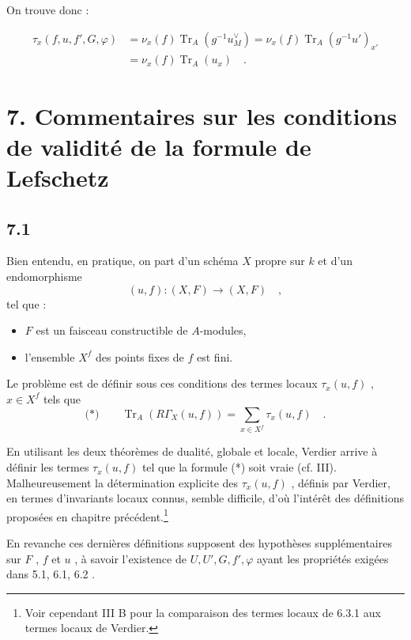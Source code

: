 \documentclass[11pt]{article}
\providecommand{\Tr}{\operatorname{Tr}}
\providecommand{\Tr}{\operatorname{Tr}}
\providecommand{\Tr}{\operatorname{Tr}}
\providecommand{\Tr}{\operatorname{Tr}}
\providecommand{\Tr}{\operatorname{Tr}}
\begin{document}
On trouve donc :

\begin{equation}\tag{6.4.9}
\begin{aligned}
\tau_x(f,u, f', G, \varphi) &= \nu_x(f) \Tr_A(g^{-1}u_M^\vee) = \nu_x(f) \Tr_A(g^{-1}u')_{x'} \\
&= \nu_x(f) \Tr_A(u_x) \quad .
\end{aligned}
\end{equation}

\section*{7. Commentaires sur les conditions de validité de la formule de Lefschetz}

\subsection*{7.1}
Bien entendu, en pratique, on part d'un schéma $X$ propre sur $k$ et d'un endomorphisme
\[
(u, f) : (X, F) \longrightarrow (X, F) \quad ,
\]
tel que :
\begin{itemize}
\item $F$ est un faisceau constructible de $A$-modules,
\item l'ensemble $X^f$ des points fixes de $f$ est fini.
\end{itemize}

Le problème est de définir sous ces conditions des termes locaux $\tau_x(u, f)$ , $x \in X^f$ tels que
\[
\text{(*)} \qquad \Tr_A(R\Gamma_X(u, f)) = \sum_{x \in X^f} \tau_x(u, f) \quad .
\]

En utilisant les deux théorèmes de dualité, globale et locale, Verdier arrive à définir les termes $\tau_x(u, f)$ tel que la formule (*) soit vraie (cf. III). Malheureusement la détermination explicite des $\tau_x(u, f)$ , définis par Verdier, en termes d'invariants locaux connus, semble difficile, d'où l'intérêt des définitions proposées en chapitre précédent.\footnote{Voir cependant III B pour la comparaison des termes locaux de 6.3.1 aux termes locaux de Verdier.}

En revanche ces dernières définitions supposent des hypothèses supplémentaires sur $F$ , $f$ et $u$ , à savoir l'existence de $U, U', G, f', \varphi$ ayant les propriétés exigées dans 5.1, 6.1, 6.2 .

\end{document}
